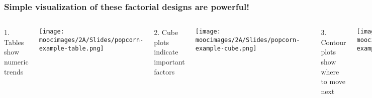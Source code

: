 \documentclass[handout,11pt,aspectratio=169,mathserif]{beamer}
\begin{document}
\begin{frame}\frametitle{Simple visualization of these factorial designs are powerful!}
	\begin{columns}[T]
			1. Tables show numeric trends
			
			\vspace{2pt}
		    \texttt{[image: \\moocimages/2A/Slides/popcorn-example-table.png]}
			
			
			2.	Cube plots indicate important factors
			
			\texttt{[image: \\moocimages/2A/Slides/popcorn-example-cube.png]}
			
			\rule[3mm]{0.01cm}{85mm}%
			
			3.	Contour plots show where to move next
			
			\texttt{[image: \\moocimages/2A/Slides/popcorn-example-contour.png]}
			
			4.	Interaction plots show synergies [next...]
			
			\texttt{[image: \\moocimages/2A/Slides/popcorn-example-interaction.png]}
			
	\end{columns}
	
	
\end{frame}




{
\begin{frame}\frametitle{}
\end{frame}}

{
\begin{frame}\frametitle{}
\end{frame}}

{
\begin{frame}\frametitle{}
\end{frame}}
\end{document}
